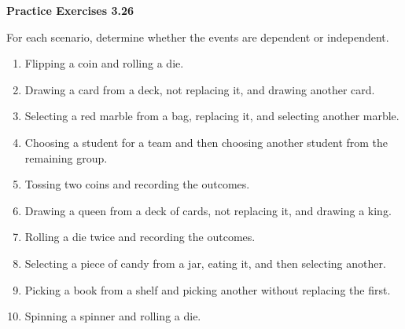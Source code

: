 \vspace{0.3ex}
\noindent\textbf{Practice Exercises 3.26}

\vspace{0.2ex}

For each scenario, determine whether the events are dependent or independent.

\begin{enumerate}[label=\color{blue}\arabic*.]
    \item Flipping a coin and rolling a die.
    \item Drawing a card from a deck, not replacing it, and drawing another card.
    \item Selecting a red marble from a bag, replacing it, and selecting another marble.
    \item Choosing a student for a team and then choosing another student from the remaining group.
    \item Tossing two coins and recording the outcomes.
    \item Drawing a queen from a deck of cards, not replacing it, and drawing a king.
    \item Rolling a die twice and recording the outcomes.
    \item Selecting a piece of candy from a jar, eating it, and then selecting another.
    \item Picking a book from a shelf and picking another without replacing the first.
    \item Spinning a spinner and rolling a die.
\end{enumerate}
